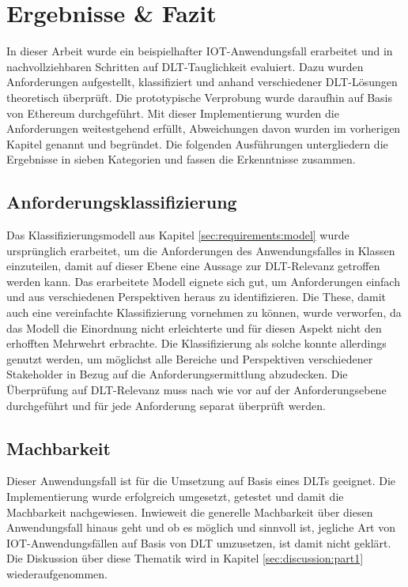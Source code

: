 \chapter{Ergebnisse \& Fazit}
\label{ch:results}
In dieser Arbeit wurde ein beispielhafter \ac{IOT}-Anwendungsfall erarbeitet und in nachvollziehbaren Schritten auf \ac{DLT}-Tauglichkeit evaluiert. Dazu wurden Anforderungen aufgestellt, klassifiziert und anhand verschiedener \ac{DLT}-Lösungen theoretisch überprüft. Die prototypische Verprobung wurde daraufhin auf Basis von Ethereum durchgeführt. Mit dieser Implementierung wurden die Anforderungen weitestgehend erfüllt, Abweichungen davon wurden im vorherigen Kapitel genannt und begründet. Die folgenden Ausführungen untergliedern die Ergebnisse in sieben Kategorien und fassen die Erkenntnisse zusammen.


\section{Anforderungsklassifizierung}
\label{sec:results:classification}
Das Klassifizierungsmodell aus Kapitel \ref{sec:requirements:model} wurde ursprünglich erarbeitet, um die Anforderungen des Anwendungsfalles in Klassen einzuteilen, damit auf dieser Ebene eine Aussage zur \ac{DLT}-Relevanz getroffen werden kann. Das erarbeitete Modell eignete sich gut, um Anforderungen einfach und aus verschiedenen Perspektiven heraus zu identifizieren. Die These, damit auch eine vereinfachte Klassifizierung vornehmen zu können, wurde verworfen, da das Modell die Einordnung nicht erleichterte und für diesen Aspekt nicht den erhofften Mehrwehrt erbrachte. Die Klassifizierung als solche konnte allerdings genutzt werden, um möglichst alle Bereiche und Perspektiven verschiedener Stakeholder in Bezug auf die Anforderungsermittlung abzudecken. Die Überprüfung auf \ac{DLT}-Relevanz muss nach wie vor auf der Anforderungsebene durchgeführt und für jede Anforderung separat überprüft werden.

\section{Machbarkeit}
\label{sec:results:feasibility}
Dieser Anwendungsfall ist für die Umsetzung auf Basis eines \ac{DLT}s geeignet. Die Implementierung wurde erfolgreich umgesetzt, getestet und damit die Machbarkeit nachgewiesen. Inwieweit die generelle Machbarkeit über diesen Anwendungsfall hinaus geht und ob es möglich und sinnvoll ist, jegliche Art von \ac{IOT}-Anwendungsfällen auf Basis von \ac{DLT} umzusetzen, ist damit nicht geklärt. Die Diskussion über diese Thematik wird in Kapitel \ref{sec:discussion:part1} wiederaufgenommen.

